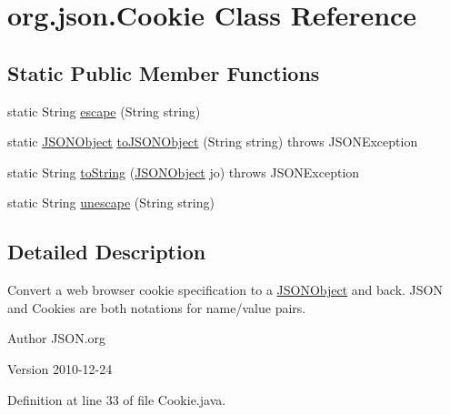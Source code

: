 \hypertarget{classorg_1_1json_1_1_cookie}{\section{org.\-json.\-Cookie Class Reference}
\label{classorg_1_1json_1_1_cookie}
}
\subsection*{Static Public Member Functions}
\begin{DoxyCompactItemize}
\item 
static String \hyperlink{classorg_1_1json_1_1_cookie_a4422021192515d995de2cef87d7836f2}{escape} (String string)
\item 
static \hyperlink{classorg_1_1json_1_1_j_s_o_n_object}{J\-S\-O\-N\-Object} \hyperlink{classorg_1_1json_1_1_cookie_aaa6ae4ad2aa1db11eef24362049ce982}{to\-J\-S\-O\-N\-Object} (String string)  throws J\-S\-O\-N\-Exception 
\item 
static String \hyperlink{classorg_1_1json_1_1_cookie_a474a31a5f0b4f23d94b11c69e1d62cd1}{to\-String} (\hyperlink{classorg_1_1json_1_1_j_s_o_n_object}{J\-S\-O\-N\-Object} jo)  throws J\-S\-O\-N\-Exception 
\item 
static String \hyperlink{classorg_1_1json_1_1_cookie_aea680b85e70e5a4bb34279c00b4c4bdd}{unescape} (String string)
\end{DoxyCompactItemize}


\subsection{Detailed Description}
Convert a web browser cookie specification to a \hyperlink{classorg_1_1json_1_1_j_s_o_n_object}{J\-S\-O\-N\-Object} and back. J\-S\-O\-N and Cookies are both notations for name/value pairs. \begin{DoxyAuthor}{Author}
J\-S\-O\-N.\-org 
\end{DoxyAuthor}
\begin{DoxyVersion}{Version}
2010-\/12-\/24 
\end{DoxyVersion}


Definition at line 33 of file Cookie.\-java.



